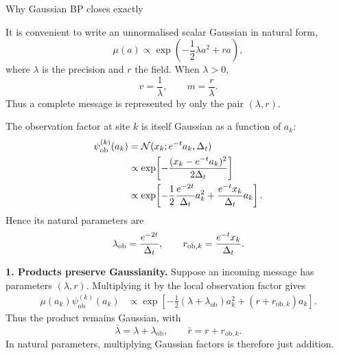 \begin{toolbox}{Why Gaussian BP closes exactly}

It is convenient to write an unnormalised scalar Gaussian in natural form,
\begin{equation}
  \mu(a)
  \propto
  \exp\!\left(
    -\frac12 \lambda a^2+r a
  \right),
  \label{eq:bp-natural-message}
\end{equation}
where $\lambda$ is the precision and $r$ the field. When $\lambda>0$,
\begin{equation}
  v=\frac{1}{\lambda},
  \qquad
  m=\frac{r}{\lambda}.
\end{equation}
Thus a complete message is represented by only the pair $(\lambda,r)$.

The observation factor at site $k$ is itself Gaussian as a function of
$a_k$:
\begin{align}
  \psi_{\mathrm{ob}}^{(k)}(a_k)
  &=
  \mathcal{N}(x_k;e^{-t}a_k,\Delta_t)\\
  &\propto
  \exp\!\left[
    -\frac{(x_k-e^{-t}a_k)^2}{2\Delta_t}
  \right]\\
  &\propto
  \exp\!\left[
    -\frac12
      \frac{e^{-2t}}{\Delta_t}a_k^2
    +
      \frac{e^{-t}x_k}{\Delta_t}a_k
  \right].
  \label{eq:bp-observation-natural}
\end{align}
Hence its natural parameters are
\begin{equation}
  \lambda_{\mathrm{ob}}
  =
  \frac{e^{-2t}}{\Delta_t},
  \qquad
  r_{\mathrm{ob},k}
  =
  \frac{e^{-t}x_k}{\Delta_t}.
  \label{eq:bp-observation-parameters}
\end{equation}

\medskip
\noindent\textbf{1. Products preserve Gaussianity.}
Suppose an incoming message has parameters $(\lambda,r)$. Multiplying it by
the local observation factor gives
\begin{align}
  \mu(a_k)\psi_{\mathrm{ob}}^{(k)}(a_k)
  &\propto
  \exp\!\left[
    -\frac12
      (\lambda+\lambda_{\mathrm{ob}})a_k^2
    +
      (r+r_{\mathrm{ob},k})a_k
  \right].
\end{align}
Thus the product remains Gaussian, with
\begin{equation}
  \bar\lambda
  =
  \lambda+\lambda_{\mathrm{ob}},
  \qquad
  \bar r
  =
  r+r_{\mathrm{ob},k}.
  \label{eq:bp-product-update}
\end{equation}
In natural parameters, multiplying Gaussian factors is therefore just
addition.


\end{toolbox}
